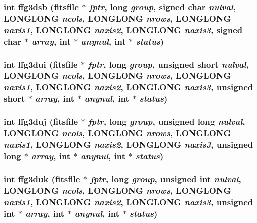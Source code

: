 \subsubsection{\setlength{\rightskip}{0pt plus 5cm}int ffg3dsb (\bf{fitsfile} $\ast$ {\em fptr}, long {\em group}, signed char {\em nulval}, \bf{LONGLONG} {\em ncols}, \bf{LONGLONG} {\em nrows}, \bf{LONGLONG} {\em naxis1}, \bf{LONGLONG} {\em naxis2}, \bf{LONGLONG} {\em naxis3}, signed char $\ast$ {\em array}, int $\ast$ {\em anynul}, int $\ast$ {\em status})}\label{src_2fitsio_8h_b4a4f9b012ac8fb6d7291d5d6392b60a}


\subsubsection{\setlength{\rightskip}{0pt plus 5cm}int ffg3dui (\bf{fitsfile} $\ast$ {\em fptr}, long {\em group}, unsigned short {\em nulval}, \bf{LONGLONG} {\em ncols}, \bf{LONGLONG} {\em nrows}, \bf{LONGLONG} {\em naxis1}, \bf{LONGLONG} {\em naxis2}, \bf{LONGLONG} {\em naxis3}, unsigned short $\ast$ {\em array}, int $\ast$ {\em anynul}, int $\ast$ {\em status})}\label{src_2fitsio_8h_c768e91e9d8cf7fd8e540a2a7e85deba}


\subsubsection{\setlength{\rightskip}{0pt plus 5cm}int ffg3duj (\bf{fitsfile} $\ast$ {\em fptr}, long {\em group}, unsigned long {\em nulval}, \bf{LONGLONG} {\em ncols}, \bf{LONGLONG} {\em nrows}, \bf{LONGLONG} {\em naxis1}, \bf{LONGLONG} {\em naxis2}, \bf{LONGLONG} {\em naxis3}, unsigned long $\ast$ {\em array}, int $\ast$ {\em anynul}, int $\ast$ {\em status})}\label{src_2fitsio_8h_d886765b9948d84262f50cc8852df8f1}


\subsubsection{\setlength{\rightskip}{0pt plus 5cm}int ffg3duk (\bf{fitsfile} $\ast$ {\em fptr}, long {\em group}, unsigned int {\em nulval}, \bf{LONGLONG} {\em ncols}, \bf{LONGLONG} {\em nrows}, \bf{LONGLONG} {\em naxis1}, \bf{LONGLONG} {\em naxis2}, \bf{LONGLONG} {\em naxis3}, unsigned int $\ast$ {\em array}, int $\ast$ {\em anynul}, int $\ast$ {\em status})}\label{src_2fitsio_8h_a9dabc5660546bef20f4e26cd7e63621}


